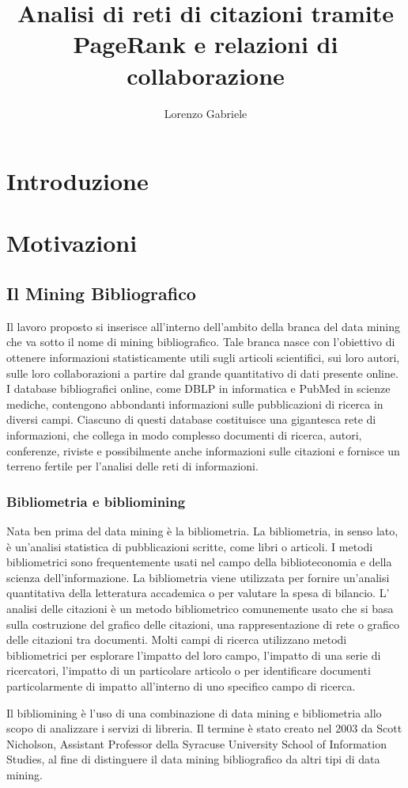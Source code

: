 \documentclass[a4paper, 12pt]{article}
\title{Analisi di reti di citazioni tramite PageRank e relazioni di collaborazione}
\author{Lorenzo Gabriele}
\let\oldsection\section
\renewcommand\section{\clearpage\oldsection}
\begin{document}
\maketitle
\clearpage
\tableofcontents
\clearpage

\section{Introduzione}

\section{Motivazioni}

\subsection{Il Mining Bibliografico}
Il lavoro proposto si inserisce all'interno dell'ambito della branca del data mining che va sotto il nome di mining bibliografico. Tale branca nasce con l'obiettivo di ottenere informazioni statisticamente utili sugli articoli scientifici, sui loro autori, sulle loro collaborazioni a partire dal grande quantitativo di dati presente online. \\
I database bibliografici online, come DBLP in informatica e PubMed in scienze mediche, contengono abbondanti informazioni sulle pubblicazioni di ricerca in diversi campi. Ciascuno di questi database costituisce una gigantesca rete di informazioni, che collega in modo complesso documenti di ricerca, autori, conferenze, riviste e possibilmente anche informazioni sulle citazioni e fornisce un terreno fertile per l'analisi delle reti di informazioni.
\subsubsection{Bibliometria e bibliomining}
Nata ben prima del data mining è la bibliometria. La bibliometria, in senso lato, è un'analisi statistica di pubblicazioni scritte, come libri o articoli. I metodi bibliometrici sono frequentemente usati nel campo della biblioteconomia e della scienza dell'informazione. La bibliometria viene utilizzata per fornire un'analisi quantitativa della letteratura accademica o per valutare la spesa di bilancio. L' analisi delle citazioni è un metodo bibliometrico comunemente usato che si basa sulla costruzione del grafico delle citazioni, una rappresentazione di rete o grafico delle citazioni tra documenti. Molti campi di ricerca utilizzano metodi bibliometrici per esplorare l'impatto del loro campo, l'impatto di una serie di ricercatori, l'impatto di un particolare articolo o per identificare documenti particolarmente di impatto all'interno di uno specifico campo di ricerca.
\par
Il bibliomining è l'uso di una combinazione di data mining e bibliometria allo scopo di analizzare i servizi di libreria. Il termine è stato creato nel 2003 da Scott Nicholson, Assistant Professor della Syracuse University School of Information Studies, al fine di distinguere il data mining bibliografico da altri tipi di data mining.
\end{document}

